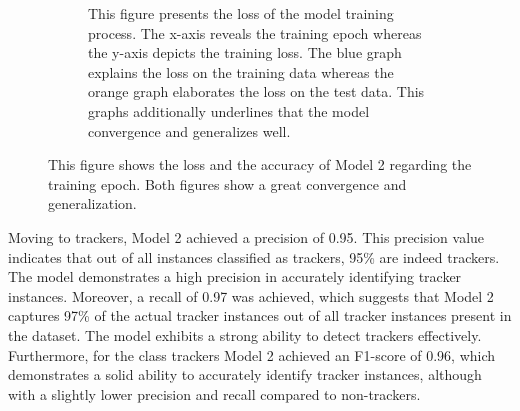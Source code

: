 \begin{figure}[ht!]
\begin{subfigure}[b]{.47\textwidth}
      \caption{This figure presents the loss of the model training process. The x-axis reveals the training epoch whereas the y-axis depicts
      the training loss. The blue graph explains the loss on the training data whereas the orange graph elaborates the loss on the test data. 
      This graphs additionally underlines that the model convergence and generalizes well.
    }
      \label{fig:lossM2}
  \end{subfigure}
  \caption{This figure shows the loss and the accuracy of Model 2 regarding the training epoch. Both figures show a great convergence and generalization.}
  \label{fig:lossaccM2}
\end{figure}
Moving to trackers, Model 2 achieved a precision of 0.95. This precision value indicates that out of all instances
classified as trackers, 95\% are indeed trackers. The model demonstrates a high precision in accurately identifying tracker instances.
Moreover, a recall of 0.97 was achieved, which suggests that Model 2 captures 97\% of the actual tracker instances
out of all tracker instances present in the dataset. The model exhibits a strong ability to detect trackers effectively.
Furthermore, for the class trackers Model 2 achieved an F1-score of 0.96, which demonstrates a solid ability to accurately
identify tracker instances, although with a slightly lower precision and recall compared to non-trackers.

